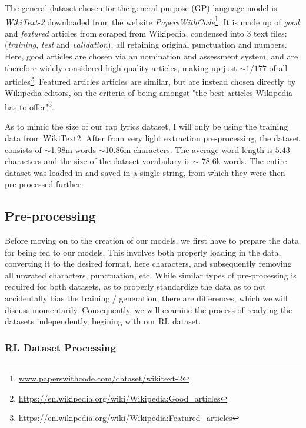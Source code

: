 The general dataset chosen for the general-purpose (GP) language model is \textit{WikiText-2} \cite{WikiText2016} downloaded from the website \textit{PapersWithCode}\footnote{\url{www.paperswithcode.com/dataset/wikitext-2}}. It is made up of \textit{good} and \textit{featured} articles from scraped from Wikipedia, condensed into 3 text files: (\textit{training}, \textit{test} and \textit{validation}), all retaining original punctuation and numbers. Here, good articles are chosen via an nomination and assessment system, and are therefore widely considered high-quality articles, making up just $\sim1/177$ of all articles\footnote{\url{https://en.wikipedia.org/wiki/Wikipedia:Good_articles}}. Featured articles articles are similar, but are instead chosen directly by Wikipedia editors, on the criteria of being amongst "the best articles Wikipedia has to offer"\footnote{\url{https://en.wikipedia.org/wiki/Wikipedia:Featured_articles}}.

As to mimic the size of our rap lyrics dataset, I will only be using the training data from WikiText2. After from very light extraction pre-processing, the dataset consists of $\sim$1.98m words $\sim$10.86m characters. The average word length is $5.43$ characters and the size of the dataset vocabulary is $\sim$ 78.6k words. The entire dataset was loaded in and saved in a single string, from which they were then pre-processed further.

\subsection{Pre-processing}
\label{sec:pre-processing}

Before moving on to the creation of our models, we first have to prepare the data for being fed to our models. This involves both properly loading in the data, converting it to the desired format, here characters, and subsequently removing all unwated characters, punctuation, etc. While similar types of pre-processing is required for both datasets, as to properly standardize the data as to not accidentally bias the training / generation, there are differences, which we will discuss momentarily. Consequently, we will examine the process of readying the datasets independently, begining with our RL dataset.

\subsubsection{RL Dataset Processing}
\label{rap-pre-processing}

